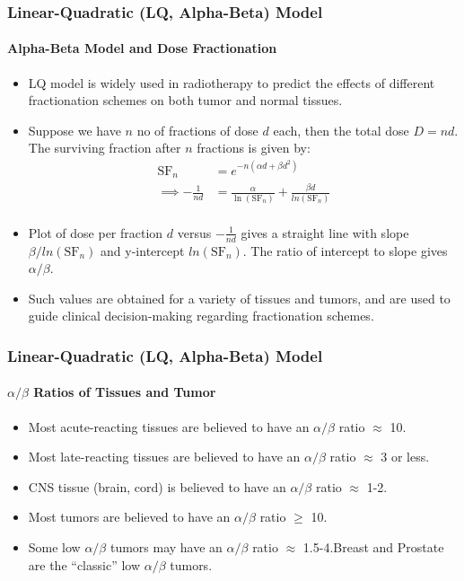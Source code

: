 \documentclass{beamer}
\begin{document}
\begin{frame}
  \frametitle{Linear-Quadratic (LQ, Alpha-Beta) Model}
  \framesubtitle{Alpha-Beta Model and Dose Fractionation}
  \begin{itemize}
    \item LQ model is widely used in radiotherapy to predict the effects of different fractionation schemes on both tumor and normal tissues.
    \item Suppose we have $n$ no of fractions of dose $d$ each, then the total dose $D = nd$. The surviving fraction after $n$ fractions is given by:
    \begin{align*}
      \text{SF}_n &= e^{-n(\alpha d + \beta d^2)} \\
      \implies - \frac{1}{nd} &= \frac{\alpha}{\ln(\text{SF}_n)} + \frac{\beta d}{ln(\text{SF}_n)} \\
    \end{align*}
    \item Plot of dose per fraction $d$ versus $- \frac{1}{nd}$ gives a straight line with slope $\beta/ln(\text{SF}_n)$ and y-intercept $ln(\text{SF}_n)$. The ratio of intercept to slope gives $\alpha/\beta$.
    \item Such values are obtained for a variety of tissues and tumors, and are used to guide clinical decision-making regarding fractionation schemes.
  \end{itemize}
\end{frame}


\begin{frame}
  \frametitle{Linear-Quadratic (LQ, Alpha-Beta) Model}
  \framesubtitle{$\alpha/\beta$ Ratios of Tissues and Tumor}
  \begin{itemize}
    \item Most acute-reacting tissues are believed to have an $\alpha/\beta$ ratio $\approx$ 10.
    \item Most late-reacting tissues are believed to have an $\alpha/\beta$ ratio $\approx$ 3 or less.
    \item CNS tissue (brain, cord) is believed to have an $\alpha/\beta$ ratio $\approx$ 1-2.
    \item Most tumors are believed to have an $\alpha/\beta$ ratio $\geq$ 10.
    \item Some low $\alpha/\beta$ tumors may have an $\alpha/\beta$ ratio $\approx$ 1.5-4.Breast and Prostate are the “classic” low $\alpha/\beta$ tumors.
  \end{itemize}
\end{frame}
\end{document}
